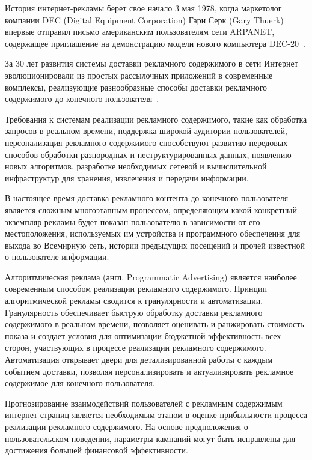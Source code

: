 
История интернет-рекламы берет свое начало 3 мая 1978, когда маркетолог компании DEC (Digital Equipment Corporation) 
Гари Серк (Gary Thuerk) впервые отправил письмо американским пользователям сети ARPANET, содержащее приглашение
на демонстрацию модели нового компьютера DEC-20~\autocite{online:spam}.

За 30 лет развития системы доставки рекламного содержимого в сети Интернет эволюционировали из простых рассылочных
приложений в современные комплексы, реализующие разнообразные способы доставки рекламного содержимого до 
конечного пользователя~\autocite{online:google}.

Требования к системам реализации рекламного содержимого, такие как обработка запросов в реальном времени, 
поддержка широкой аудитории пользователей, персонализация рекламного содержимого способствуют развитию
передовых способов обработки разнородных и неструктурированных данных, появлению новых алгоритмов, разработке
необходимых сетевой и вычислительной инфраструктур для хранения, извлечения и передачи информации.

В настоящее время доставка рекламного контента до конечного пользователя является сложным многоэтапным процессом, 
определяющим какой конкретный экземпляр рекламы будет показан пользователю в зависимости от его местоположения,
используемых им устройства и программного обеспечения для выхода во Всемирную сеть, истории предыдущих
посещений и прочей известной о пользователе информации.

Алгоритмическая реклама (англ. Programmatic Advertising) является наиболее современным способом реализации 
рекламного содержимого. Принцип алгоритмической рекламы сводится к гранулярности и автоматизации. Гранулярность
обеспечивает быструю обработку доставки рекламного содержимого в реальном времени, позволяет оценивать и ранжировать
стоимость показа и создает условия для оптимизации бюджетной эффективность всех сторон, участвующих в процессе 
реализации рекламного содержимого. Автоматизация открывает двери для детализированной работы с каждым событием доставки,
позволяя персонализировать и актуализировать рекламное содержимое для конечного пользователя.

Прогнозирование взаимодействий пользователей с рекламным содержимым интернет страниц является необходимым этапом
в оценке прибыльности процесса реализации рекламного содержимого. На основе предположения о 
пользовательском поведении, параметры кампаний могут быть исправлены для достижения большей
финансовой эффективности.

